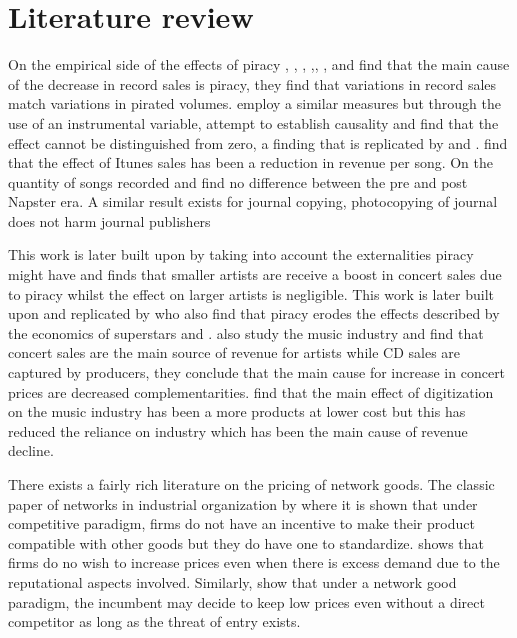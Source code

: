 \documentclass[12pt]{article}
\numberwithin{equation}{section}
\begin{document}
\section{Literature review}


On the empirical side of the effects of piracy \cite{liebowitz2005pitfalls}, \cite{liebowitz2008testing}, \cite{rob2006piracy}, \cite{blackburn2004line},\cite{dejean2009can}, \cite{zentner2006measuring}, \cite{hong2013measuring} and \cite{Liebowitz2006}  find that the main cause of the decrease in record sales is piracy, they find that variations in record sales match variations in pirated volumes. \cite{oberholzer2007effect} employ a similar measures but through the use of an instrumental variable, attempt to establish causality and find that the effect cannot be distinguished from zero, a finding that is replicated by \cite{hammond2014profit} and \cite{oberholzer2010file}. \cite{waldfogel2010music} find that the effect of Itunes sales has been a reduction in revenue per song. On the quantity of songs recorded \cite{waldfogel2011bye} and \cite{waldfogel2012music} find no difference between the pre and post Napster era. A similar result exists for journal copying,  photocopying of journal does not harm journal publishers \cite{liebowitz1985copying}

This work is later built upon by taking into account the externalities piracy might have and finds that smaller artists are receive a boost in concert sales due to piracy whilst the effect on larger artists is negligible\citep{mortimer2012supply}. This work is later built upon and replicated by \cite{gopal2006artists} who also find that piracy erodes the effects described by the economics of superstars\cite{rosen1981economics} and \cite{macdonald1988economics}. \cite{krueger2005economics} also study the music industry and find that concert sales are the main source of revenue for artists while CD sales are captured by producers, they conclude that the main cause for increase in concert prices are decreased complementarities. \cite{waldfogel2017digitization} find that the main effect of digitization on the music industry has been a more products at lower cost but this has reduced the reliance on industry which has been the main cause of revenue decline.

There exists a fairly rich literature on the pricing of network goods. The classic paper of networks in industrial organization by \cite{KS86} where it is shown that under  competitive paradigm, firms do not have an incentive to make their product compatible with other goods but they do have one to standardize. \cite{becker1991note} shows that firms do no wish to increase prices even when there is excess demand due to the reputational aspects involved. Similarly, \cite{FT00} show that under a network good paradigm, the incumbent may decide to keep low prices even without a direct competitor as long as the threat of entry exists. 
\end{document}
